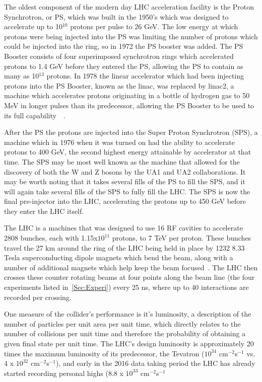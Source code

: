 The oldest component of the modern day LHC acceleration facility is the Proton Synchrotron, or PS, which was built in the 1950's which was designed to accelerate up to 10$^{10}$ protons per pulse to 26 GeV.  
The low energy at which protons were being injected into the PS was limiting the number of protons which could be injected into the ring, so in 1972 the PS booster was added.  
The PS Booster consists of four superimposed synchrotron rings which accelerated protons to 1.4 GeV before they entered the PS, allowing the PS to contain as many as 10$^{13}$ protons.  
In 1978 the linear accelerator which had been injecting protons into the PS Booster, known as the linac, was replaced by linac2, a machine which accelerates protons originating in a bottle of hydrogen gas to 50 MeV in longer pulses than its predecessor, allowing the PS Booster to be used to its full capability~\cite{PSHistory}~\cite{PSHistory2}.  

After the PS the protons are injected into the Super Proton Synchrotron (SPS), a machine which in 1976 when it was turned on had the ability to accelerate protons to 400 GeV, the second highest energy attainable by accelerator at that time.  
The SPS may be most well known as the machine that allowed for the discovery of both the W and Z bosons by the UA1 and UA2 collaborations.  
It may be worth noting that it takes several fills of the PS to fill the SPS, and it will again take several fills of the SPS to fully fill the LHC.  
The SPS is now the final pre-injector into the LHC, accelerating the protons up to 450 GeV before they enter the LHC itself.  

The LHC is a machines that was designed to use 16 RF cavities to accelerate 2808 bunches, each with 1.15x$10^{11}$ protons, to 7 TeV per proton.  
These bunches travel the 27 km around the ring of the LHC being held in place by 1232 8.33 Tesla superconducting dipole magnets which bend the beam, along with a number of additional magnets which help keep the beam focused~\cite{LHCTDR}.  
The LHC then crosses these counter rotating beams at four points along the beam line (the four experiments listed in~\ref{Sec:Experi}) every 25 ns, where up to 40 interactions are recorded per crossing.  

One measure of the collider's performance is it's luminosity, a description of the number of particles per unit area per unit time, which directly relates to the number of collisions per unit time and therefore the probability of obtaining a given final state per unit time.  
The LHC's design luminosity is approximately 20 times the maximum luminosity of its predecessor, the Tevatron ($10^{34}$ cm$^{-2}$s$^{-1}$ vs. 4 x $10^{32}$ cm$^{-2}$s$^{-1}$), and early in the 2016 data taking period the LHC has already started recording personal highs (8.8 x $10^{33}$ cm$^{-2}$s$^{-1}$

